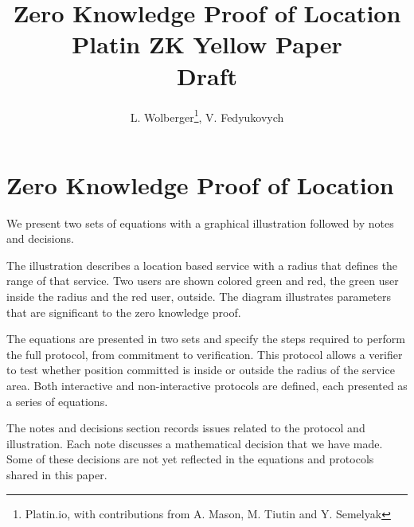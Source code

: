 \documentclass{article}
\begin{document}
\pagecolor{yellow}


\title{
	Zero Knowledge Proof of Location\\
	\small{
	Platin ZK Yellow Paper\\
	Draft}
}
\author{L. Wolberger\thanks{Platin.io, with contributions from A. Mason, M. Tiutin and Y. Semelyak}, V. Fedyukovych\footnotemark[1]}
\maketitle

\section{Zero Knowledge Proof of Location}

We present two sets of equations with a graphical illustration followed by notes and decisions. 

The illustration describes a location based service with a radius that defines the range of that service.
Two users are shown colored green and red, the green user inside the radius and the red user, outside.
The diagram illustrates parameters that are significant to the zero knowledge proof. 

The equations are presented in two sets and specify the steps required to perform the full protocol, from commitment to verification.
This protocol allows a verifier to test whether position committed is inside or outside the radius of the service area.
Both interactive  and non-interactive protocols are defined, each presented as a series of equations. 

The notes and decisions section records issues related to the protocol and illustration.
Each note discusses a mathematical decision that we have made.
Some of these decisions are not yet reflected in the equations and protocols shared in this paper. 
\end{document}

